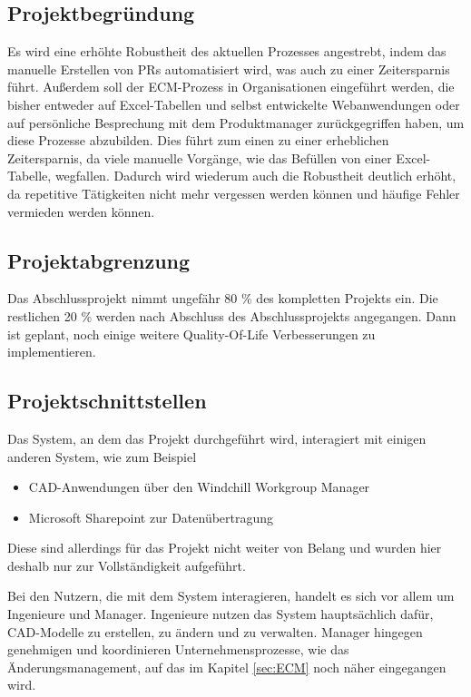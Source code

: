 \subsection{Projektbegründung} 
\label{sec:Projektbegruendung}
Es wird eine erhöhte Robustheit des aktuellen Prozesses angestrebt, indem das manuelle Erstellen von \acp{PR} automatisiert wird, was auch zu einer Zeitersparnis führt.
Außerdem soll der \ac{ECM}-Prozess in Organisationen eingeführt werden, die bisher entweder auf Excel-Tabellen und selbst entwickelte Webanwendungen oder auf persönliche Besprechung mit dem Produktmanager zurückgegriffen haben, um diese Prozesse abzubilden.
Dies führt zum einen zu einer erheblichen Zeitersparnis, da viele manuelle Vorgänge, wie das Befüllen von einer Excel-Tabelle, wegfallen.
Dadurch wird wiederum auch die Robustheit deutlich erhöht, da repetitive Tätigkeiten nicht mehr vergessen werden können und häufige Fehler vermieden werden können.

\subsection{Projektabgrenzung}
Das Abschlussprojekt nimmt ungefähr 80 \% des kompletten Projekts ein.
Die restlichen 20 \% werden nach Abschluss des Abschlussprojekts angegangen.
Dann ist geplant, noch einige weitere Quality-Of-Life Verbesserungen zu implementieren.

\subsection{Projektschnittstellen}
\label{sec:Projektschnittstellen}

Das System, an dem das Projekt durchgeführt wird, interagiert mit einigen anderen System, wie zum Beispiel
\begin{itemize}
    \item CAD-Anwendungen über den Windchill Workgroup Manager
    \item Microsoft Sharepoint zur Datenübertragung
\end{itemize}

Diese sind allerdings für das Projekt nicht weiter von Belang und wurden hier deshalb nur zur Vollständigkeit aufgeführt.

Bei den Nutzern, die mit dem System interagieren, handelt es sich vor allem um Ingenieure und Manager.
Ingenieure nutzen das System hauptsächlich dafür, CAD-Modelle zu erstellen, zu ändern und zu verwalten.
Manager hingegen genehmigen und koordinieren Unternehmensprozesse, wie \zB das Änderungsmanagement, auf das im Kapitel \ref{sec:ECM} noch näher eingegangen wird.

